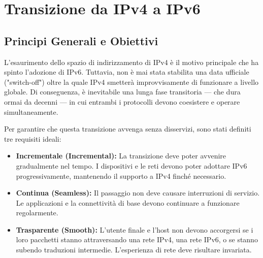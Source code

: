 \chapter{Transizione da IPv4 a IPv6}

\section{Principi Generali e Obiettivi}
L'esaurimento dello spazio di indirizzamento di IPv4 è il motivo principale che ha spinto l'adozione di IPv6. Tuttavia, non è mai stata stabilita una data ufficiale ("switch-off") oltre la quale IPv4 smetterà improvvisamente di funzionare a livello globale. Di conseguenza, è inevitabile una lunga fase transitoria --- che dura ormai da decenni --- in cui entrambi i protocolli devono coesistere e operare simultaneamente.

Per garantire che questa transizione avvenga senza disservizi, sono stati definiti tre requisiti ideali:
\begin{itemize}
\item \textbf{Incrementale (Incremental):} La transizione deve poter avvenire gradualmente nel tempo. I dispositivi e le reti devono poter adottare IPv6 progressivamente, mantenendo il supporto a IPv4 finché necessario.
\item \textbf{Continua (Seamless):} Il passaggio non deve causare interruzioni di servizio. Le applicazioni e la connettività di base devono continuare a funzionare regolarmente.
\item \textbf{Trasparente (Smooth):} L'utente finale e l'host non devono accorgersi se i loro pacchetti stanno attraversando una rete IPv4, una rete IPv6, o se stanno subendo traduzioni intermedie. L'esperienza di rete deve risultare invariata.
\end{itemize}

